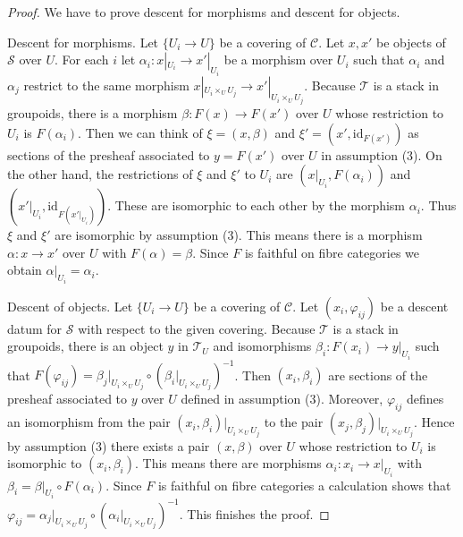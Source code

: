 \begin{proof}
We have to prove descent for morphisms and descent for objects.

\medskip\noindent
Descent for morphisms. Let $\{U_i \to U\}$ be a covering of $\mathcal{C}$.
Let $x, x'$ be objects of $\mathcal{S}$ over $U$. For each $i$
let $\alpha_i : x|_{U_i} \to x'|_{U_i}$ be a morphism over $U_i$
such that $\alpha_i$ and $\alpha_j$ restrict to the same morphism
$x|_{U_i \times_U U_j} \to x'|_{U_i \times_U U_j}$.
Because $\mathcal{T}$ is a stack in groupoids, there is a morphism
$\beta : F(x) \to F(x')$ over $U$ whose restriction to $U_i$ is $F(\alpha_i)$.
Then we can think of $\xi = (x, \beta)$ and $\xi' = (x', \text{id}_{F(x')})$
as sections of the presheaf associated to $y = F(x')$ over $U$
in assumption (3). On the other hand, the restrictions of
$\xi$ and $\xi'$ to $U_i$ are $(x|_{U_i}, F(\alpha_i))$
and $(x'|_{U_i}, \text{id}_{F(x'|_{U_i})})$.
These are isomorphic to each other by the morphism $\alpha_i$.
Thus $\xi$ and $\xi'$ are isomorphic by assumption (3). This means there is a
morphism $\alpha : x \to x'$ over $U$ with $F(\alpha) = \beta$.
Since $F$ is faithful on fibre categories we obtain
$\alpha|_{U_i} = \alpha_i$.

\medskip\noindent
Descent of objects. Let $\{U_i \to U\}$ be a covering of $\mathcal{C}$.
Let $(x_i, \varphi_{ij})$ be a descent datum for $\mathcal{S}$ with
respect to the given covering. Because $\mathcal{T}$ is a stack in groupoids,
there is an object $y$ in $\mathcal{T}_U$ and isomorphisms
$\beta_i : F(x_i) \to y|_{U_i}$ such that
$F(\varphi_{ij}) = \beta_j|_{U_i \times_U U_j} \circ
(\beta_i|_{U_i \times_U U_j})^{-1}$.
Then $(x_i, \beta_i)$ are sections of the presheaf associated to
$y$ over $U$ defined in assumption (3).
Moreover, $\varphi_{ij}$ defines an isomorphism
from the pair $(x_i, \beta_i)|_{U_i \times_U U_j}$ to
the pair $(x_j, \beta_j)|_{U_i \times_U U_j}$.
Hence by assumption (3) there exists a pair $(x, \beta)$ over $U$
whose restriction to $U_i$ is isomorphic to $(x_i, \beta_i)$.
This means there are morphisms $\alpha_i : x_i \to x|_{U_i}$
with $\beta_i = \beta|_{U_i} \circ F(\alpha_i)$.
Since $F$ is faithful on fibre categories a calculation shows
that $\varphi_{ij} = \alpha_j|_{U_i \times_U U_j} \circ
(\alpha_i|_{U_i \times_U U_j})^{-1}$. This finishes the proof.
\end{proof}

